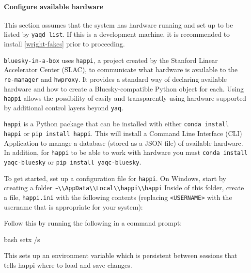 \paragraph{Configure available \yaq hardware}

This section assumes that the system has \yaq hardware running and set up to be listed by \texttt{yaqd list}.
If this is a development machine, it is recommended to install \ref{wright-fakes} prior to proceeding.

\texttt{bluesky-in-a-box} uses \texttt{happi}\cite{}, a project created by the Stanford Linear Accelerator Center (SLAC), to communicate what hardware is available to the \texttt{re-manager} and \texttt{hwproxy}.
It provides a standard way of declaring available hardware and how to create a Bluesky-compatible Python object for each.
Using \texttt{happi} allows the possibility of easily and transparently using hardware supported by additional control layers beyond \texttt{yaq}.

\texttt{happi} is a Python package that can be installed with either \texttt{conda install happi} or \texttt{pip install happi}.
This will install a Command Line Interface (CLI) Application to manage a database (stored as a JSON file) of available hardware.
In addition, for \texttt{happi} to be able to work with \yaq hardware you must \texttt{conda install yaqc-bluesky} or \texttt{pip install yaqc-bluesky}.

To get started, set up a configuration file for \texttt{happi}.
On Windows, start by creating a folder \nolinkurl{~\\AppData\\Local\\happi\\happi}
Inside of this folder, create a file, \nolinkurl{happi.ini} with the following contents (replacing \texttt{<USERNAME>} with the username that is appropriate for your system):


Follow this by running the following in a command prompt:

\begin{codefragment}{bash}
setx /s %
\end{codefragment}

This sets up an environment variable which is persistent between sessions that tells happi where to load and save changes.

